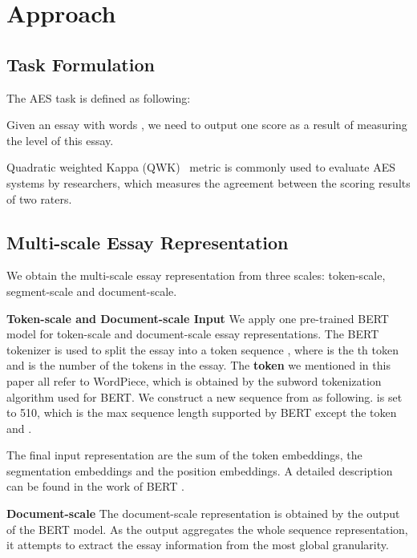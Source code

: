 \documentclass[11pt]{article}
\begin{document}
\section{Approach}

\subsection{Task Formulation}
The AES task is defined as following:

Given an essay with  words , we need to output one score  as a result of measuring the level of this essay.

Quadratic weighted Kappa (QWK)~\citep{Cohen1968} metric is commonly used to evaluate AES systems by researchers, which measures the agreement between the scoring results of two raters.

\subsection{Multi-scale Essay Representation}

We obtain the multi-scale essay representation from three scales: token-scale, segment-scale and document-scale.

\textbf{Token-scale and Document-scale Input}
We apply one pre-trained BERT~\citep{Devlin:2019} model for token-scale and document-scale essay representations. The BERT tokenizer is used to split the essay into a token sequence , where  is the th token and  is the number of the tokens in the essay.
The \textbf{token} we mentioned in this paper all refer to WordPiece, which is obtained by the subword tokenization algorithm used for BERT.
We construct a new sequence  from  as following.  is set to 510, which is the max sequence length supported by BERT except the token  and .

\begin{small}
[CLS][SEP][CLS][SEP][CLS][PAD][SEP]
\end{small}


The final input representation are the sum of the token embeddings, the segmentation embeddings and the position embeddings.
A detailed description can be found in the work of BERT \citep {Devlin:2019}.

\textbf{Document-scale}
The document-scale representation is obtained by the  output of the BERT model. As the  output aggregates the whole sequence representation, it attempts to extract the essay information from the most global granularity.
   
\end{document}
